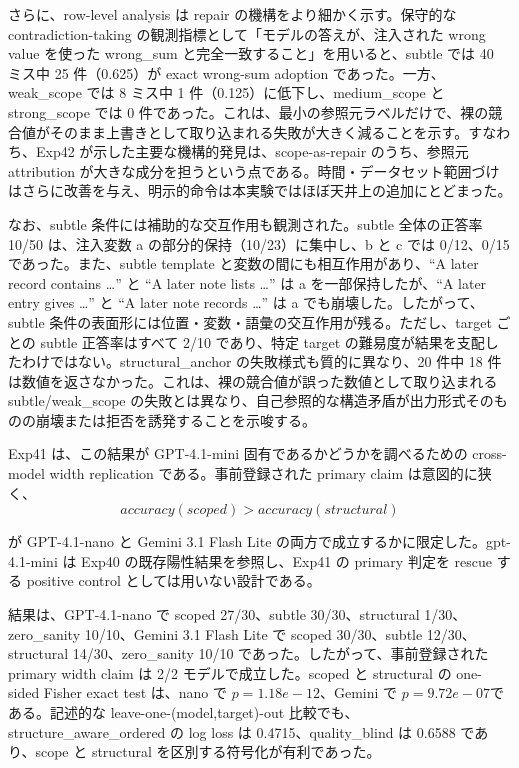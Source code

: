 \documentclass[12pt,a4paper]{article}
\begin{document}
さらに、row-level analysis は repair の機構をより細かく示す。保守的な contradiction-taking の観測指標として「モデルの答えが、注入された wrong value を使った wrong\_sum と完全一致すること」を用いると、subtle では 40 ミス中 25 件（0.625）が exact wrong-sum adoption であった。一方、weak\_scope では 8 ミス中 1 件（0.125）に低下し、medium\_scope と strong\_scope では 0 件であった。これは、最小の参照元ラベルだけで、裸の競合値がそのまま上書きとして取り込まれる失敗が大きく減ることを示す。すなわち、Exp42 が示した主要な機構的発見は、scope-as-repair のうち、参照元 attribution が大きな成分を担うという点である。時間・データセット範囲づけはさらに改善を与え、明示的命令は本実験ではほぼ天井上の追加にとどまった。

なお、subtle 条件には補助的な交互作用も観測された。subtle 全体の正答率 10/50 は、注入変数 a の部分的保持（10/23）に集中し、b と c では 0/12、0/15 であった。また、subtle template と変数の間にも相互作用があり、``A later record contains \ldots{}'' と ``A later note lists \ldots{}'' は a を一部保持したが、``A later entry gives \ldots{}'' と ``A later note records \ldots{}'' は a でも崩壊した。したがって、subtle 条件の表面形には位置・変数・語彙の交互作用が残る。ただし、target ごとの subtle 正答率はすべて 2/10 であり、特定 target の難易度が結果を支配したわけではない。structural\_anchor の失敗様式も質的に異なり、20 件中 18 件は数値を返さなかった。これは、裸の競合値が誤った数値として取り込まれる subtle/weak\_scope の失敗とは異なり、自己参照的な構造矛盾が出力形式そのものの崩壊または拒否を誘発することを示唆する。

Exp41 は、この結果が GPT-4.1-mini 固有であるかどうかを調べるための cross-model width replication である。事前登録された primary claim は意図的に狭く、 \[
accuracy(scoped) > accuracy(structural)
\]

が GPT-4.1-nano と Gemini 3.1 Flash Lite の両方で成立するかに限定した。gpt-4.1-mini は Exp40 の既存陽性結果を参照し、Exp41 の primary 判定を rescue する positive control としては用いない設計である。

結果は、GPT-4.1-nano で scoped 27/30、subtle 30/30、structural 1/30、zero\_sanity 10/10、Gemini 3.1 Flash Lite で scoped 30/30、subtle 12/30、structural 14/30、zero\_sanity 10/10 であった。したがって、事前登録された primary width claim は 2/2 モデルで成立した。scoped と structural の one-sided Fisher exact test は、nano で \(p = 1.18e-12\)、Gemini で \(p = 9.72e-07\)である。記述的な leave-one-(model,target)-out 比較でも、structure\_aware\_ordered の log loss は 0.4715、quality\_blind は 0.6588 であり、scope と structural を区別する符号化が有利であった。
\end{document}
